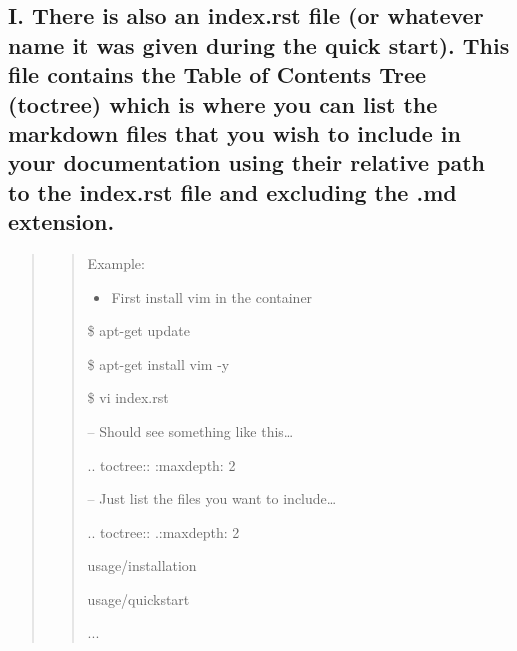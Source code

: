 \documentclass[letterpaper,10pt,english]{sphinxmanual}
\begin{document}
\subsection{I. There is also an index.rst file (or whatever name it was given during the quick start). This file contains the Table of Contents Tree (toctree) which is where you can list the markdown files that you wish to include in your documentation using their relative path to the index.rst file and excluding the .md extension.}
\label{docs/Process:i-there-is-also-an-index-rst-file-or-whatever-name-it-was-given-during-the-quick-start-this-file-contains-the-table-of-contents-tree-toctree-which-is-where-you-can-list-the-markdown-files-that-you-wish-to-include-in-your-documentation-using-their-relative-path-to-the-index-rst-file-and-excluding-the-md-extension}\begin{quote}
\begin{quote}

Example:
\begin{itemize}
\item {} 
First install vim in the container

\end{itemize}

\$ apt-get update

\$ apt-get install vim -y

\$ vi index.rst

-- Should see something like this…

.. toctree::
:maxdepth: 2

-- Just list the files you want to include…

.. toctree::
.:maxdepth: 2

usage/installation

usage/quickstart

...
\end{quote}
\end{quote}
\end{document}
